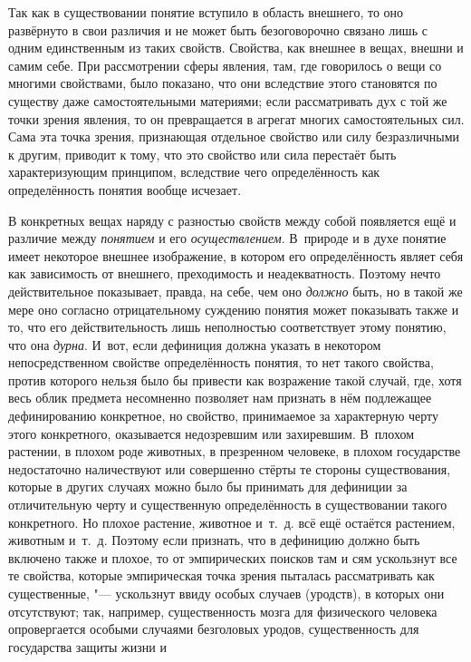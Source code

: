 Так как в существовании понятие вступило в область внешнего,
то оно развёрнуто в свои различия и не может быть безоговорочно связано
лишь с одним единственным из таких свойств. Свойства, как внешнее в вещах,
внешни и самим себе. При рассмотрении сферы явления, там, где говорилось о
вещи со многими свойствами, было показано, что они вследствие этого
становятся по существу даже самостоятельными материями; если рассматривать
дух с той же точки зрения явления, то он превращается в агрегат многих
самостоятельных сил. Сама эта точка зрения, признающая отдельное свойство
или силу безразличными к другим, приводит к тому, что это свойство или сила
перестаёт быть характеризующим принципом, вследствие чего определённость
как определённость понятия вообще исчезает.

В конкретных вещах наряду с разностью свойств между собой
появляется ещё и различие между {\em понятием} и его {\em осуществлением}.
В~природе и в духе понятие имеет некоторое внешнее изображение, в котором его
определённость являет себя как зависимость от внешнего, преходимость и
неадекватность. Поэтому нечто действительное показывает, правда, на себе,
чем оно {\em должно}
быть, но в такой же мере оно согласно отрицательному суждению
понятия может показывать также и то, что его действительность лишь
неполностью соответствует этому понятию, что она {\em дурна}. И~вот, если
дефиниция должна указать в некотором непосредственном свойстве
определённость понятия, то нет такого свойства, против которого нельзя было
бы привести как возражение такой случай, где, хотя весь облик предмета
несомненно позволяет нам признать в нём подлежащее
дефинированию конкретное, но свойство, принимаемое за характерную черту
этого конкретного, оказывается недозревшим или захиревшим. В~плохом
растении, в плохом роде животных, в презренном человеке, в плохом
государстве недостаточно наличествуют или совершенно стёрты те стороны
существования, которые в других случаях можно было бы принимать для
дефиниции за отличительную черту и существенную определённость в
существовании такого конкретного. Но плохое растение, животное и~т.~д. всё
ещё остаётся растением, животным и~т.~д. Поэтому если признать, что в
дефиницию должно быть включено также и плохое, то от эмпирических поисков
там и сям ускользнут все те свойства, которые эмпирическая точка зрения
пыталась рассматривать как существенные, "--- ускользнут ввиду
особых случаев (уродств), в которых они отсутствуют; так, например,
существенность мозга для физического человека опровергается особыми
случаями безголовых уродов, существенность для государства защиты жизни и
